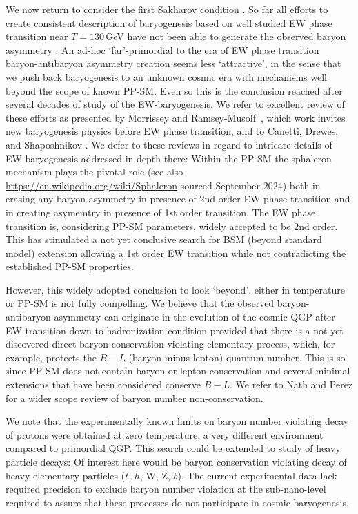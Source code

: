 {\color{black} We now return to consider the first Sakharov condition .  So far all efforts to create consistent description of baryogenesis based on well studied EW phase transition near $T=130$\,GeV have not been able to generate the observed baryon asymmetry \cite{Kuzmin:1985mm,Kuzmin:1987wn,Arnold:1987mh,Kolb:1996jt,Riotto:1999yt,Nielsen:2001fy,Giudice:2003jh,Davidson:2008bu,Morrissey:2012db,Canetti:2012zc}. An ad-hoc `far'-primordial to the era of EW  phase transition baryon-antibaryon asymmetry creation seems less `attractive', in the sense that we push back baryogenesis to an unknown cosmic era with mechanisms well beyond the scope of known PP-SM. Even so this is the conclusion reached after several decades of study of the EW-baryogenesis. We refer to excellent review of these efforts as presented by Morrissey and Ramsey-Musolf~\cite{Morrissey:2012db}, which work invites new baryogenesis physics before EW phase transition, and to Canetti, Drewes,  and Shaposhnikov \cite{Canetti:2012zc}. We defer to these reviews in regard to intricate details of EW-baryogenesis  addressed in depth there: Within the PP-SM the sphaleron mechanism plays the pivotal role (see also \url{https://en.wikipedia.org/wiki/Sphaleron} sourced September 2024) both in erasing any baryon asymmetry in presence of 2nd order EW phase transition and in creating asymemtry in presence of 1st order transition. The EW phase transition is, considering PP-SM parameters, widely accepted to be 2nd order. This has stimulated a not yet conclusive search for BSM (beyond standard model) extension allowing a 1st order EW transition while not contradicting the established PP-SM properties.}

{\color{black}However, this  widely adopted conclusion to look `beyond', either in temperature or PP-SM is not fully compelling. We believe that the observed baryon-antibaryon  asymmetry can originate in the evolution of the cosmic QGP after EW transition down to hadronization condition provided that there is a  not yet discovered direct baryon conservation violating elementary process, which, for example, protects the $B-L$ (baryon minus lepton) quantum number. This is so since PP-SM does not contain baryon or lepton conservation and several minimal extensions that have been considered conserve $B-L$.  We refer to Nath and Perez \cite{Nath:2006ut} for a wider scope review of baryon number non-conservation. }

{\color{black}We note that the experimentally known limits on baryon number violating decay of protons were obtained at zero temperature, a very different environment compared to primordial QGP. This search could be extended to study of heavy particle decays: Of interest here would be baryon conservation violating decay of heavy elementary particles ($t$, $h$, W, Z, $b$). The current experimental data lack required precision to exclude  baryon number violation at the sub-nano-level required to assure that these processes do not participate in cosmic baryogenesis.} 
 
